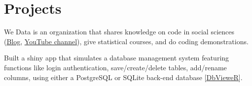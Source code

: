 \documentclass[]{plushcv}
\begin{document}
\begin{minipage}[t]{0.70\textwidth}

\section{Projects}


\begin{tightemize}
\item We Data is an organization that shares knowledge on code in social sciences (\href{https://wedata.ch/}{\underline{Blog}}, \href{https://www.youtube.com/channel/UCGktdbvbc_H-JEkYYTvwRVw}{\underline{YouTube channel}}), give statistical courses, and do coding demonstrations. 
\end{tightemize}
\sectionsep

\begin{tightemize}
\item Built a shiny app that simulates a database management system featuring functions like login authentication, save/create/delete tables, add/rename columns, using either a PostgreSQL or SQLite back-end database [\href{https://github.com/munoztd0/DBMS}{\underline{DbVieweR}}].
\end{tightemize}
\sectionsep










%
%

\end{minipage} 
\end{document}
